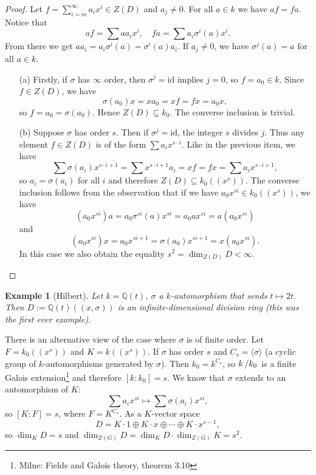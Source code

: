 \documentclass[10pt, a4paper]{article}
\newtheorem{example}[thm]{Example}
\newenvironment{noticeC}{%
  \tcolorbox[%
  notitle,
  empty,
  enhanced,  %
  breakable,
  coltext=black, 
  fontupper=\rmfamily,
  noparskip,
  sharp corners,
  boxrule=-1pt,  %
  frame hidden,
  left=7pt,  %
  right=7pt,
  top=5pt,
  bottom=5pt,
  before skip=2.5ex plus 2pt,
  after skip=2.5ex plus 2pt,
  overlay unbroken and last={%
  },
  ]}
{\endtcolorbox}
\newenvironment{myproof}%
  {\begin{noticeC}\begin{proof}}%
  {\end{proof}\end{noticeC}}
\newcommand{\Q}{\mathbb {Q}}
\newcommand{\quot}[2]{{\raisebox{0em}{$#1$}\left/\raisebox{0em}{$#2$}\right.}}
\begin{document}
\begin{myproof}
  Let $f = \sum_{i = m} ^\infty a_i x^i \in Z(D)$ and $a_j \neq 0$.
  For all $a \in k$ we have $af = fa$. Notice that 
  $$af = \sum a a_i x^i,\quad fa = \sum a_i \sigma^i(a) x^i.$$
  From there we get $a a_i = a_i \sigma^i (a) = \sigma^i (a) a_i$.
  If $a_j \neq 0$, we have $\sigma^j (a) = a$ for all $a \in k$.
  \begin{itemize}
    \item[(a)] Firstly, if $\sigma$ has $\infty$ order, then 
    $\sigma^j = \mathrm{id}$ implies $j = 0$, so $f = a_0 \in k$.
    Since $f \in Z(D)$, we have 
    $$\sigma(a_0) x = x a_0 = x f = f x = a_0 x,$$
    so $f = a_0 = \sigma (a_0)$. Hence $Z(D) \subseteq k_0$. The converse inclusion is trivial.
    \item[(b)] Suppose $\sigma$ has order $s$. Then if $\sigma^j = \mathrm{id}$, the integer $s$ divides $j$.
    Thus any element $f \in Z(D)$ is of the form $\sum a_i x^{s \cdot i}$.
    Like in the previous item, we have 
    $$\sum \sigma(a_i) x^{s \cdot i + 1} = \sum x^{s \cdot i + 1} a_i = x f = f x = \sum a_i x^{s \cdot i + 1},$$
    so $a_i = \sigma(a_i)$ for all $i$ and therefore $Z(D) \subseteq k_0 ((x^s))$.
    The converse inclusion follows from the observation that if we have $a_0 x^{si} \in k_0 ((x^s))$, we have 
    $$(a_0 x^{si}) a = a_0 \sigma^{si} (a) x^{si} = a_0 a x^{si} = a(a_0 x^{si})$$
    and 
    $$(a_0 x^{si}) x = a_0 x^{si + 1} = \sigma (a_0) x^{si + 1} = x (a_0 x^{si}).$$
    In this case we also obtain the equality $s^2 = \dim_{Z(D)} D < \infty$. \qedhere
  \end{itemize}
\end{myproof}

\begin{example}[Hilbert]
  Let $k = \Q(t)$, $\sigma$ a $k$-automorphism that sends $t \mapsto 2t$.
  Then $D:= \Q(t) ((x, \sigma))$ is an infinite-dimensional division ring (this was the first ever example).
\end{example}

There is an alternative view of the case where $\sigma$ is of finite order.
Let $F = k_0 ((x^s))$ and $K = k((x^s))$. If $\sigma$ has order $s$ and $C_s = \langle \sigma \rangle$ (a cyclic group of $k$-automorphisms generated by $\sigma$).
Then $k_0 = k^{C_s}$, so $\quot{k}{k_0}$ is a finite Galois extension\footnote{Milne: Fields and Galois theory, theorem 3.10} and therefore $[k : k_0] = s$.
We know that $\sigma$ extends to an automorphism of $K$:
$$\sum a_i x^{si} \mapsto \sum \sigma (a_i) x^{si},$$
so $[K: F] = s$, where $F = K^{C_s}$. As a $K$-vector space 
$$D = K \cdot 1 \oplus K \cdot x \oplus \cdots \oplus K \cdot x^{s - 1},$$
so $\dim_K D = s$ and $\dim_{Z(G)} D = \dim_K D \cdot \dim_{Z(G)} K = s^2$.
\end{document}
